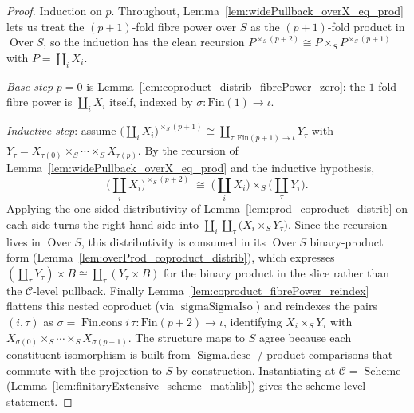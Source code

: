 \begin{proof}
  Induction on \(p\). Throughout, Lemma~\ref{lem:widePullback_overX_eq_prod} lets us treat the
  \((p+1)\)-fold fibre power over \(S\) as the \((p+1)\)-fold product in \(\operatorname{Over} S\),
  so the induction has the clean recursion \(P^{\times_S (p+2)} \cong P \times_S P^{\times_S (p+1)}\)
  with \(P = \coprod_i X_i\).

  \emph{Base step} \(p = 0\) is Lemma~\ref{lem:coproduct_distrib_fibrePower_zero}: the \(1\)-fold
  fibre power is \(\coprod_i X_i\) itself, indexed by \(\sigma : \mathrm{Fin}(1) \to \iota\).

  \emph{Inductive step}: assume \(\bigl(\coprod_i X_i\bigr)^{\times_S (p+1)} \cong \coprod_{\tau :
  \mathrm{Fin}(p+1) \to \iota} Y_\tau\) with \(Y_\tau = X_{\tau(0)} \times_S \cdots \times_S
  X_{\tau(p)}\). By the recursion of Lemma~\ref{lem:widePullback_overX_eq_prod} and the inductive
  hypothesis,
  \[
    \bigl(\textstyle\coprod_i X_i\bigr)^{\times_S (p+2)}
      \;\cong\;
    \bigl(\textstyle\coprod_i X_i\bigr) \times_S \bigl(\textstyle\coprod_\tau Y_\tau\bigr).
  \]
  Applying the one-sided distributivity of
  Lemma~\ref{lem:prod_coproduct_distrib} on each side turns the right-hand side into
  \(\coprod_{i}\coprod_{\tau} \bigl(X_i \times_S Y_\tau\bigr)\). Since the recursion lives in
  \(\operatorname{Over} S\), this distributivity is consumed in its \(\operatorname{Over} S\)
  binary-product form (Lemma~\ref{lem:overProd_coproduct_distrib}), which expresses
  \((\coprod_\tau Y_\tau) \times B \cong \coprod_\tau (Y_\tau \times B)\) for the binary product in the
  slice rather than the \(\mathcal{C}\)-level pullback. Finally
  Lemma~\ref{lem:coproduct_fibrePower_reindex} flattens this nested coproduct
  (via \(\operatorname{sigmaSigmaIso}\)) and reindexes the pairs \((i,\tau)\) as
  \(\sigma = \operatorname{Fin.cons} i\,\tau : \mathrm{Fin}(p+2) \to \iota\), identifying \(X_i
  \times_S Y_\tau\) with \(X_{\sigma(0)} \times_S \cdots \times_S X_{\sigma(p+1)}\). The structure
  maps to \(S\) agree because each constituent isomorphism is built from \(\operatorname{Sigma.desc}\)
  / product comparisons that commute with the projection to \(S\) by construction. Instantiating at
  \(\mathcal{C} = \operatorname{Scheme}\) (Lemma~\ref{lem:finitaryExtensive_scheme_mathlib}) gives the
  scheme-level statement.
\end{proof}

